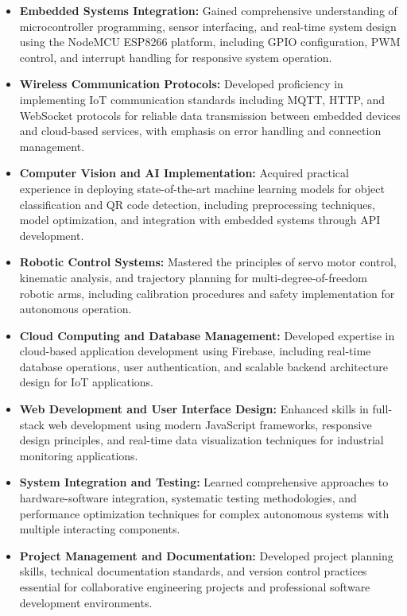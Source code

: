 \begin{itemize}
\item \textbf{Embedded Systems Integration:} Gained comprehensive understanding of microcontroller programming, sensor interfacing, and real-time system design using the NodeMCU ESP8266 platform, including GPIO configuration, PWM control, and interrupt handling for responsive system operation.

\item \textbf{Wireless Communication Protocols:} Developed proficiency in implementing IoT communication standards including MQTT, HTTP, and WebSocket protocols for reliable data transmission between embedded devices and cloud-based services, with emphasis on error handling and connection management.

\item \textbf{Computer Vision and AI Implementation:} Acquired practical experience in deploying state-of-the-art machine learning models for object classification and QR code detection, including preprocessing techniques, model optimization, and integration with embedded systems through API development.

\item \textbf{Robotic Control Systems:} Mastered the principles of servo motor control, kinematic analysis, and trajectory planning for multi-degree-of-freedom robotic arms, including calibration procedures and safety implementation for autonomous operation.

\item \textbf{Cloud Computing and Database Management:} Developed expertise in cloud-based application development using Firebase, including real-time database operations, user authentication, and scalable backend architecture design for IoT applications.

\item \textbf{Web Development and User Interface Design:} Enhanced skills in full-stack web development using modern JavaScript frameworks, responsive design principles, and real-time data visualization techniques for industrial monitoring applications.

\item \textbf{System Integration and Testing:} Learned comprehensive approaches to hardware-software integration, systematic testing methodologies, and performance optimization techniques for complex autonomous systems with multiple interacting components.

\item \textbf{Project Management and Documentation:} Developed project planning skills, technical documentation standards, and version control practices essential for collaborative engineering projects and professional software development environments.
\end{itemize}